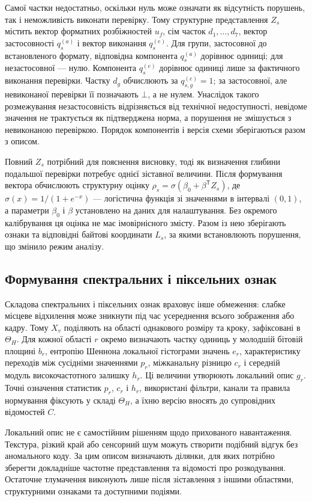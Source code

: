 Самої частки недостатньо, оскільки нуль може означати як відсутність порушень, так і неможливість виконати перевірку. Тому структурне представлення $Z_s$ містить вектор форматних розбіжностей $u_f$, сім часток $d_1,\ldots,d_7$, вектор застосовності $q_s^{(a)}$ і вектор виконання $q_s^{(e)}$. Для групи, застосовної до встановленого формату, відповідна компонента $q_s^{(a)}$ дорівнює одиниці; для незастосовної --- нулю. Компонента $q_s^{(e)}$ дорівнює одиниці лише за фактичного виконання перевірки. Частку $d_g$ обчислюють за $q_{s,g}^{(e)}=1$; за застосовної, але невиконаної перевірки її позначають $\bot$, а не нулем. Унаслідок такого розмежування незастосовність відрізняється від технічної недоступності, невідоме значення не трактується як підтверджена норма, а порушення не змішується з невиконаною перевіркою. Порядок компонентів і версія схеми зберігаються разом з описом.

Повний $Z_s$ потрібний для пояснення висновку, тоді як визначення глибини подальшої перевірки потребує однієї зіставної величини. Після формування вектора обчислюють структурну оцінку $\rho_s=\sigma(\beta_0+\beta^{\mathsf T}Z_s)$, де $\sigma(x)=1/(1+e^{-x})$ --- логістична функція зі значеннями в інтервалі $(0,1)$, а параметри $\beta_0$ і $\beta$ установлено на даних для налаштування. Без окремого калібрування ця оцінка не має імовірнісного змісту. Разом із нею зберігають ознаки та відповідні байтові координати $L_s$, за якими встановлюють порушення, що змінило режим аналізу.

\subsection{Формування спектральних і піксельних ознак}

Складова спектральних і піксельних ознак враховує інше обмеження: слабке місцеве відхилення може зникнути під час усереднення всього зображення або кадру. Тому $X_v$ поділяють на області однакового розміру та кроку, зафіксовані в $\Theta_H$. Для кожної області $r$ окремо визначають частку одиниць у молодшій бітовій площині $b_r$, ентропію Шеннона локальної гістограми значень $e_r$, характеристику переходів між сусідніми значеннями $p_r$, міжканальну різницю $c_r$ і середній модуль високочастотного залишку $h_r$. Ці величини утворюють локальний опис $g_r$. Точні означення статистик $p_r$, $c_r$ і $h_r$, використані фільтри, канали та правила нормування фіксують у складі $\Theta_H$, а їхню версію вносять до супровідних відомостей $C$.

Локальний опис не є самостійним рішенням щодо прихованого навантаження. Текстура, різкий край або сенсорний шум можуть створити подібний відгук без аномального коду. За цим описом визначають ділянки, для яких потрібно зберегти докладніше частотне представлення та відомості про розкодування. Остаточне тлумачення виконують лише після зіставлення з іншими областями, структурними ознаками та доступними подіями.


